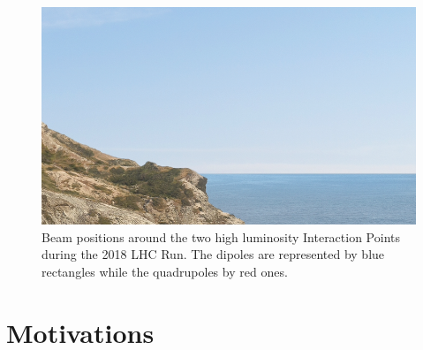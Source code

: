 
\begin{figure}[h]
  \centering
  \includegraphics[width=0.5\columnwidth]{Figures/placeholder.png}
  \caption{Beam positions around the two high luminosity Interaction Points during the 2018 LHC Run. The dipoles are represented by blue rectangles while the quadrupoles by red ones.}
  \label{fig:ir1_ir5_beam_positions}
\end{figure}


\section{Motivations}

